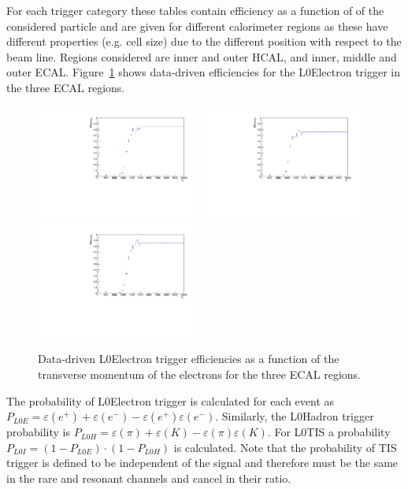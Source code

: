 For each trigger category these tables contain efficiency as a function of
\pt of the considered particle and are given for different calorimeter regions
as these have different properties (e.g. cell size) due to the different position
with respect to the beam line. Regions considered are inner and outer HCAL, and inner, middle and outer ECAL.
Figure~\ref{sec:L0eff_tables} shows data-driven efficiencies for the L0Electron trigger
in the three ECAL regions.
%
\begin{figure}[h!]
\centering
\includegraphics[width=0.48\textwidth]{RKst/figs/l0plots/l0E_Inner.pdf}
\includegraphics[width=0.48\textwidth]{RKst/figs/l0plots/l0E_Middle.pdf}
\includegraphics[width=0.48\textwidth]{RKst/figs/l0plots/l0E_Outer.pdf}
\caption{Data-driven L0Electron trigger efficiencies as a function of the transverse momentum
of the electrons for the three ECAL regions.}
\label{sec:L0eff_tables}
\end{figure}

The probability of L0Electron trigger is calculated for each event as $P_{L0E} = \varepsilon(e^+) + \varepsilon(e^-) - \varepsilon(e^+)\varepsilon(e^-)$.
Similarly, the L0Hadron trigger probability is $P_{L0H} = \varepsilon(\pi) + \varepsilon(K) - \varepsilon(\pi)\varepsilon(K)$.
For L0TIS a probability $P_{L0I} = (1-P_{L0E})\cdot(1-P_{L0H})$ is calculated.
Note that the probability of TIS trigger is defined to be independent of the signal and therefore must
be the same in the rare and resonant channels and cancel in their ratio.

